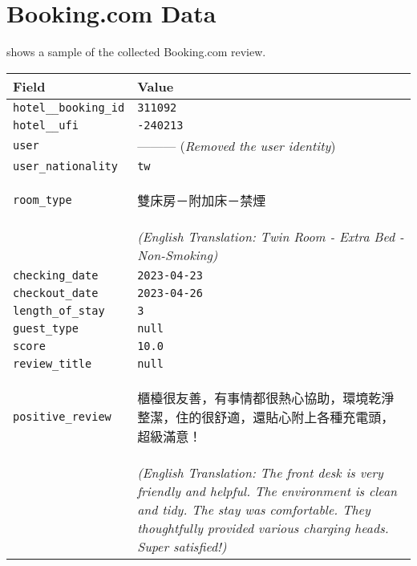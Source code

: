 \section{Booking.com Data\label{app:booking-data-sample}}
 shows a sample of the collected Booking.com review.


\begin{table*}[htbp]
    \centering \small

    \begin{tabularx}{\textwidth}{@{}lY@{}}
        \toprule
        \textbf{Field} & \textbf{Value} \\
        \midrule
        \texttt{hotel\_\_booking\_id} & \texttt{311092} \\
        \texttt{hotel\_\_ufi} & \texttt{-240213} \\
        \texttt{user} & --------- (\textit{Removed the user identity}) \\
        \texttt{user\_nationality} & \texttt{tw} \\
        \texttt{room\_type} & \begin{CJK*}{UTF8}{bsmi}雙床房－附加床－禁煙\end{CJK*} \\
        & \textit{(English Translation: Twin Room - Extra Bed - Non-Smoking)} \\
        \texttt{checking\_date} & \texttt{2023-04-23} \\
        \texttt{checkout\_date} & \texttt{2023-04-26} \\
        \texttt{length\_of\_stay} & \texttt{3} \\
        \texttt{guest\_type} & \texttt{null} \\
        \texttt{score} & \texttt{10.0} \\
        \texttt{review\_title} & \texttt{null} \\
        \texttt{positive\_review} & \begin{CJK*}{UTF8}{bsmi}櫃檯很友善，有事情都很熱心協助，環境乾淨整潔，住的很舒適，還貼心附上各種充電頭，超級滿意！\end{CJK*} \\
        & \textit{(English Translation: The front desk is very friendly and helpful. The environment is clean and tidy. The stay was comfortable. They thoughtfully provided various charging heads. Super satisfied!)} \\

\end{tabularx}
\end{table*}
